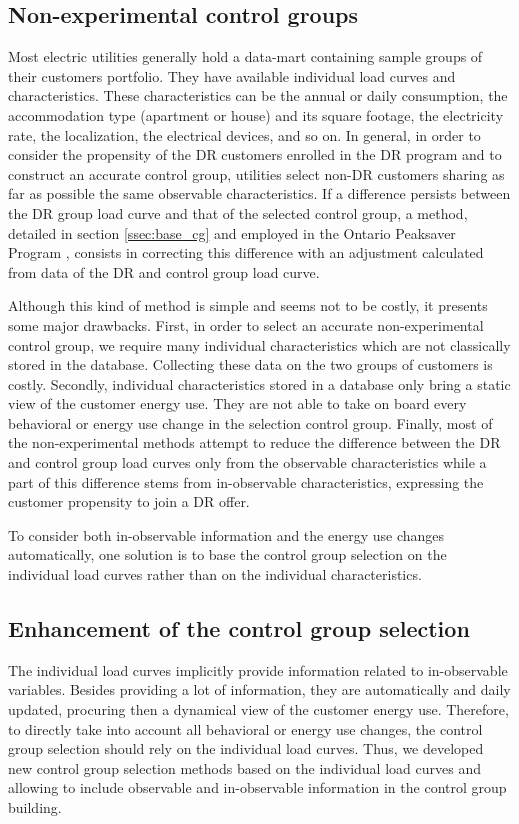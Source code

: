 \documentclass[journal]{IEEEtran}
\begin{document}
\subsection{Non-experimental control groups}
Most electric utilities generally hold a data-mart containing sample groups of their 
customers portfolio. They have available individual load curves and characteristics. 
These characteristics can be the annual or daily consumption, the accommodation type (apartment or house) 
and its square footage, the electricity rate, the localization, the electrical devices, and so on. 
In general, in order to consider the propensity of the DR customers enrolled in the DR program and to 
construct an accurate control group, utilities select non-DR customers sharing as far as 
possible the same observable characteristics. If a difference persists between the DR group 
load curve and that of the selected control group, a method, detailed in section 
\ref{ssec:base_cg} and employed in the Ontario Peaksaver Program \cite{newsham_birt_rowlands}, 
consists in correcting this difference with an adjustment calculated from data of the DR and 
control group load curve. 

Although this kind of method is simple and seems not to be costly, it presents some major drawbacks. First, 
in order to select an accurate non-experimental control group, we require many individual 
characteristics which are not classically stored in the database. Collecting these data on the two 
groups of customers is costly. Secondly, individual characteristics stored in a 
database only bring a static view of the customer energy use. They are not able to take 
on board every behavioral or energy use change in the selection control group. Finally, 
most of the non-experimental methods attempt to reduce the difference between the DR and 
control group 
load curves only from the observable characteristics while a part of this difference 
stems from in-observable characteristics, expressing the customer propensity to join 
a DR offer. 

To consider both in-observable information and the energy use changes automatically, one 
solution is to base the control group selection on the individual load curves rather than 
on the individual characteristics.

\subsection{Enhancement of the control group selection}
The individual load curves implicitly provide information related to in-observable 
variables. Besides providing a lot of information, they are automatically and daily updated, 
procuring then a dynamical view of the customer energy use. Therefore, to directly take into 
account all behavioral or energy use changes, the control group selection should rely on 
the individual load curves. Thus, we developed new control group selection methods based on 
the individual load curves and allowing to include observable and in-observable information 
in the control group building.  
\end{document}
